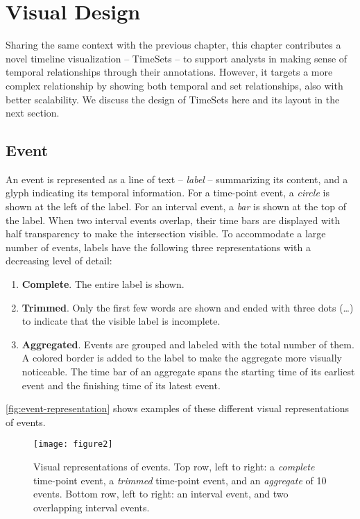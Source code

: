 \section{Visual Design}
Sharing the same context with the previous chapter, this chapter contributes a novel timeline visualization -- TimeSets -- to support analysts in making sense of temporal relationships through their annotations. However, it targets a more complex relationship by showing both temporal and set relationships, also with better scalability. We discuss the design of TimeSets here and its layout in the next section.

\subsection{Event}
An event is represented as a line of text -- \emph{label} -- summarizing its content, and a glyph indicating its temporal information. For a time-point event, a \emph{circle} is shown at the left of the label. For an interval event, a \emph{bar} is shown at the top of the label. When two interval events overlap, their time bars are displayed with half transparency to make the intersection visible. To accommodate a large number of events, labels have the following three representations with a decreasing level of detail:
\begin{enumerate}
	\item \textbf{Complete}. The entire label is shown.
	\item \textbf{Trimmed}. Only the first few words are shown and ended with three dots (\dots) to indicate that the visible label is incomplete.
	\item \textbf{Aggregated}. Events are grouped and labeled with the total number of them. A colored border is added to the label to make the aggregate more visually noticeable. The time bar of an aggregate spans the starting time of its earliest event and the finishing time of its latest event.
\end{enumerate}

\autoref{fig:event-representation} shows examples of these different visual representations of events.

\begin{figure}
\centering
\texttt{[image: figure2]}
\caption[Visual representations of events]{Visual representations of events. Top row, left to right: a \emph{complete} time-point event, a \emph{trimmed} time-point event, and an \emph{aggregate} of 10 events. Bottom row, left to right: an interval event, and two overlapping interval events.}
\label{fig:event-representation}
\end{figure}

